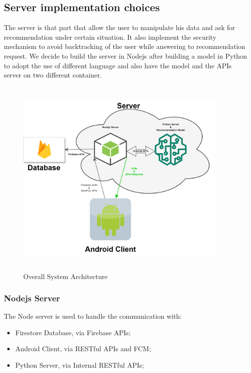 \documentclass[../../main]{subfiles}
\begin{document}
\subsection{Server implementation choices}
The server is that part that allow the user to manipulate his data and ask for recommendation under certain situation.
It also implement the security mechanism to avoid backtracking of the user while answering to recommendation request.
We decide to build the server in Nodejs after building a model in Python to adopt the use of different language and also
have the model and the APIs server on two different container. 

\begin{figure}[h]
    \centering
    \includegraphics[width=105mm,height=100mm]{images/system_architecture.png}
    \caption{Overall System Architecture}\label{fig:system_architecture}
\end{figure}

\subsubsection{Nodejs Server}
The Node server is used to handle the communication with:
\begin{itemize}
    \item Firestore Database, via Firebase APIs;
    \item Android Client, via RESTful APIs and FCM;
    \item Python Server, via Internal RESTful APIs;
\end{itemize}
\end{document}
